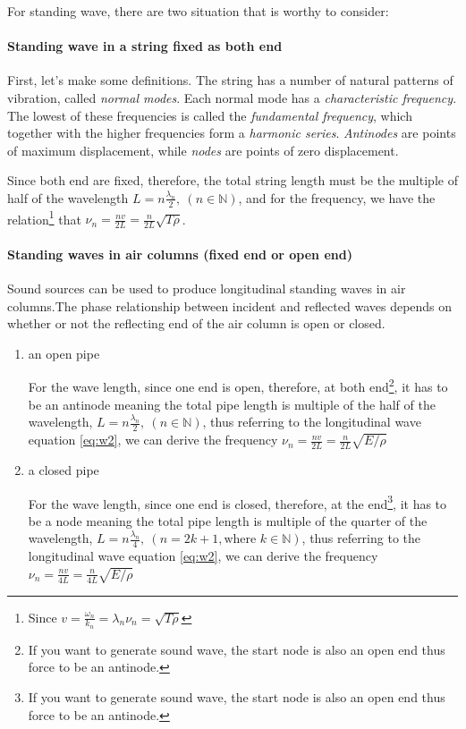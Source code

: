 \documentclass[UTF8]{book}
\begin{document}
For standing wave, there are two situation that is worthy to consider:

\paragraph{Standing wave in a string fixed as both end }

First, let's make some definitions. The string has a number of natural patterns of vibration, called \emph{normal modes}. Each normal mode has a \emph{characteristic frequency}. The lowest of these frequencies is called the \emph{fundamental frequency}, which together with the higher frequencies form a \emph{harmonic series}. \emph{Antinodes} are points of maximum displacement, while
\emph{nodes} are points of zero displacement.

Since both end are fixed, therefore, the total string length must be the multiple of half of the wavelength $L=n\frac{\lambda _n}{2},\ (n\in \mathbb{N})$, and for the frequency, we have the relation\footnote{Since $v=\frac{\omega _n}{k_n}=\lambda _n\nu _n=\sqrt{T\rho }$} that $\nu _n=\frac{nv}{2L}=\frac{n}{2L}\sqrt{T\rho }$.

\paragraph{Standing waves in air columns (fixed end or open end)} 
Sound sources can be used to produce longitudinal standing waves in air columns.The phase relationship between incident and reflected waves depends on whether or not the reflecting end of the air column is open or closed.
\begin{enumerate}
\item an open pipe

For the wave length, since one end is open, therefore, at both end\footnote{If you want to generate sound wave, the start node is also an open end thus force to be an antinode.}, it has to be an antinode meaning the total pipe length is multiple of the half of the wavelength, $L=n\frac{\lambda _n}{2},\ (n\in \mathbb{N})$, thus referring to the longitudinal wave equation \eqref{eq:w2}, we can derive the frequency $\nu _n=\frac{nv}{2L}=\frac{n}{2L}\sqrt{E/\rho }$
\item a closed pipe

For the wave length, since one end is closed, therefore, at the end\footnote{If you want to generate sound wave, the start node is also an open end thus force to be an antinode.}, it has to be a node meaning the total pipe length is multiple of the quarter of the wavelength, $L=n\frac{\lambda _n}{4},\ (n=2k+1, \text{where }k\in \mathbb{N})$, thus referring to the longitudinal wave equation \eqref{eq:w2}, we can derive the frequency $\nu _n=\frac{nv}{4L}=\frac{n}{4L}\sqrt{E/\rho }$
\end{enumerate}
\end{document}

